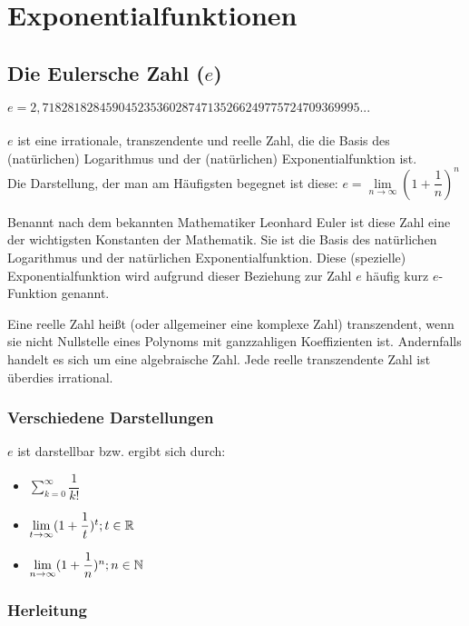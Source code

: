 \chapter{Exponentialfunktionen}

		\section{Die Eulersche Zahl ($e$)}

\begin{Definition}
$e = 2,71828182845904523536028747135266249775724709369995...$\\
\\
$e$ ist eine irrationale, transzendente und reelle Zahl, die die Basis des (natürlichen) Logarithmus und der (natürlichen) Exponentialfunktion ist.\\
Die Darstellung, der man am Häufigsten begegnet ist diese:
$e=\lim\limits_{n\to \infty}(1+\dfrac{1}{n})^n$
\end{Definition}
Benannt nach dem bekannten Mathematiker Leonhard Euler ist diese Zahl eine der wichtigsten Konstanten der Mathematik.
Sie ist die Basis des natürlichen Logarithmus und der natürlichen Exponentialfunktion. Diese (spezielle) Exponentialfunktion wird aufgrund dieser Beziehung zur Zahl $e$ häufig kurz $e$-Funktion genannt.
\begin{Definition}
  Eine reelle Zahl heißt (oder allgemeiner eine komplexe Zahl) transzendent,
  wenn sie nicht Nullstelle eines Polynoms mit ganzzahligen Koeffizienten ist.
  Andernfalls handelt es sich um eine algebraische Zahl. Jede reelle transzendente Zahl ist überdies irrational.
\end{Definition}

	\subsection{Verschiedene Darstellungen}

$e$ ist darstellbar bzw. ergibt sich durch:
\begin{itemize}
\item $\sum\limits_{k=0}^{\infty}\dfrac{1}{k!}$
\item $\lim\limits_{t\to \infty}(1+\dfrac{1}{t})^t;t\in\mathbb{R}$
\item $\lim\limits_{n\to \infty}(1+\dfrac{1}{n})^n;n\in\mathbb{N}$
\end{itemize}

	\subsection{Herleitung}

